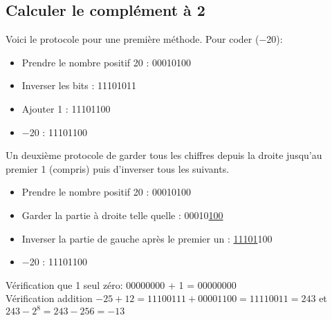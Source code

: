 \documentclass[a4paper,11pt]{article}
\begin{document}
\begin{Form}
\subsection{Calculer le complément à 2}
Voici le protocole pour une première méthode. Pour coder (−20):
\begin{itemize}
\item Prendre le nombre positif 20 : 00010100
\item Inverser les bits : 11101011
\item Ajouter 1 : 11101100
\item −20 : 11101100
\end{itemize} 
\medskip
Un deuxième protocole de garder tous les chiffres depuis la droite jusqu'au premier 1 (compris) puis d'inverser tous les suivants.
\begin{itemize}
\item Prendre le nombre positif 20 : 00010100
\item Garder la partie à droite telle quelle : 00010\underline{100}
\item Inverser la partie de gauche après le premier un : \underline{11101}100
\item −20 : 11101100
\end{itemize}
\begin{commentprof}
Vérification que 1 seul zéro: 00000000  + 1 = 00000000\\
Vérification addition $-25+12= 11100111+00001100 = 11110011 = 243$ et $243-2^8=243-256=-13$
\end{commentprof}
\end{Form}
\end{document}
